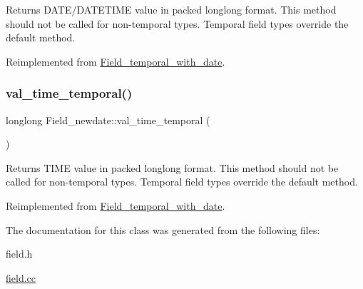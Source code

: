 Returns D\+A\+T\+E/\+D\+A\+T\+E\+T\+I\+ME value in packed longlong format. This method should not be called for non-\/temporal types. Temporal field types override the default method. 

Reimplemented from \mbox{\hyperlink{classField__temporal__with__date_a3d1a5e9fb109d1da223753c6072436ab}{Field\+\_\+temporal\+\_\+with\+\_\+date}}.

\mbox{\label{classField__newdate_aad085aaff8fef3367986f9733b79605c}} 
\subsubsection{\texorpdfstring{val\+\_\+time\+\_\+temporal()}{val\_time\_temporal()}}
{\footnotesize\ttfamily longlong Field\+\_\+newdate\+::val\+\_\+time\+\_\+temporal (\begin{DoxyParamCaption}{ }\end{DoxyParamCaption})\hspace{0.3cm}{\ttfamily [virtual]}}

Returns T\+I\+ME value in packed longlong format. This method should not be called for non-\/temporal types. Temporal field types override the default method. 

Reimplemented from \mbox{\hyperlink{classField__temporal__with__date_acf8330ac7e19ae7bdf978fc811e49c00}{Field\+\_\+temporal\+\_\+with\+\_\+date}}.



The documentation for this class was generated from the following files\+:\begin{DoxyCompactItemize}
\item 
field.\+h\item 
\mbox{\hyperlink{field_8cc}{field.\+cc}}\end{DoxyCompactItemize}
